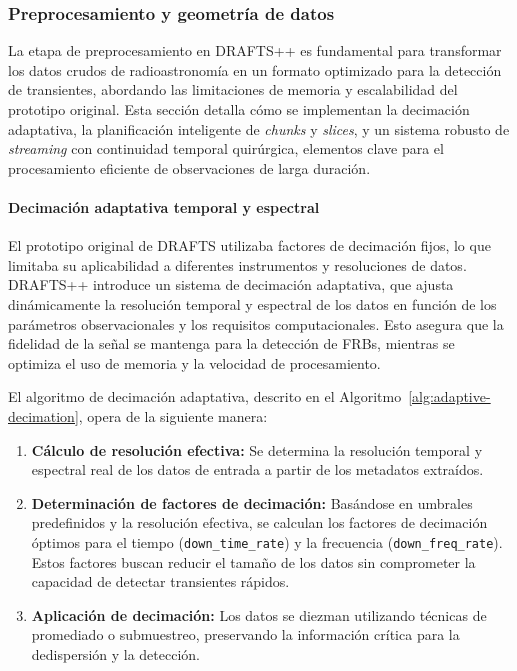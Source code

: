 \subsubsection{Preprocesamiento y geometría de datos}

La etapa de preprocesamiento en DRAFTS++ es fundamental para transformar los datos crudos de radioastronomía en un formato optimizado para la detección de transientes, abordando las limitaciones de memoria y escalabilidad del prototipo original. Esta sección detalla cómo se implementan la decimación adaptativa, la planificación inteligente de \emph{chunks} y \emph{slices}, y un sistema robusto de \emph{streaming} con continuidad temporal quirúrgica, elementos clave para el procesamiento eficiente de observaciones de larga duración.

\paragraph{Decimación adaptativa temporal y espectral}

El prototipo original de DRAFTS utilizaba factores de decimación fijos, lo que limitaba su aplicabilidad a diferentes instrumentos y resoluciones de datos. DRAFTS++ introduce un sistema de decimación adaptativa, que ajusta dinámicamente la resolución temporal y espectral de los datos en función de los parámetros observacionales y los requisitos computacionales. Esto asegura que la fidelidad de la señal se mantenga para la detección de FRBs, mientras se optimiza el uso de memoria y la velocidad de procesamiento.

El algoritmo de decimación adaptativa, descrito en el Algoritmo~\ref{alg:adaptive-decimation}, opera de la siguiente manera:
\begin{enumerate}
    \item \textbf{Cálculo de resolución efectiva:} Se determina la resolución temporal y espectral real de los datos de entrada a partir de los metadatos extraídos.
    \item \textbf{Determinación de factores de decimación:} Basándose en umbrales predefinidos y la resolución efectiva, se calculan los factores de decimación óptimos para el tiempo (\texttt{down\_time\_rate}) y la frecuencia (\texttt{down\_freq\_rate}). Estos factores buscan reducir el tamaño de los datos sin comprometer la capacidad de detectar transientes rápidos.
    \item \textbf{Aplicación de decimación:} Los datos se diezman utilizando técnicas de promediado o submuestreo, preservando la información crítica para la dedispersión y la detección.
\end{enumerate}

